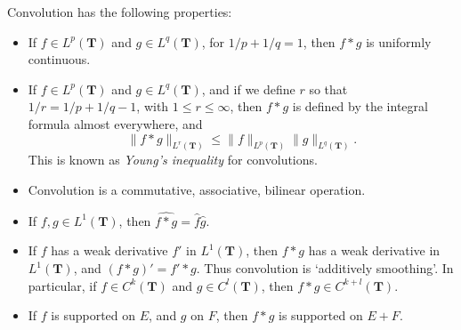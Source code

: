\begin{theorem}
    Convolution has the following properties:
    \begin{itemize}
    	\item If $f \in L^p(\mathbf{T})$ and $g \in L^q(\mathbf{T})$, for $1/p + 1/q = 1$, then $f * g$ is uniformly continuous.

    	\item If $f \in L^p(\mathbf{T})$ and $g \in L^q(\mathbf{T})$, and if we define $r$ so that $1/r = 1/p + 1/q - 1$, with $1 \leq r \leq \infty$, then $f * g$ is defined by the integral formula almost everywhere, and
    	\[ \| f * g \|_{L^r(\mathbf{T})} \leq \| f \|_{L^p(\mathbf{T})} \| g \|_{L^q(\mathbf{T})}. \]
    	This is known as {\it Young's inequality} for convolutions.

        \item Convolution is a commutative, associative, bilinear operation.

        \item If $f,g \in L^1(\mathbf{T})$, then $\widehat{f * g} = \widehat{f} \widehat{g}$.

        \item If $f$ has a weak derivative $f'$ in $L^1(\mathbf{T})$, then $f * g$ has a weak derivative in $L^1(\mathbf{T})$, and $(f * g)' = f' * g$. Thus convolution is `additively smoothing'. In particular, if $f \in C^k(\mathbf{T})$ and $g \in C^l(\mathbf{T})$, then $f * g \in C^{k+l}(\mathbf{T})$.

        \item If $f$ is supported on $E$, and $g$ on $F$, then $f * g$ is supported on $E + F$.
    \end{itemize}
\end{theorem}
